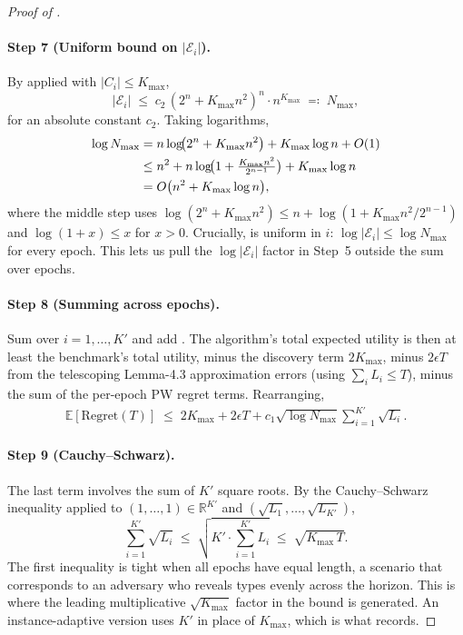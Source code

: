 \documentclass[letterpaper,9pt,twocolumn]{extarticle}
\newcommand{\cE}{\mathcal{E}}
\newcommand{\EE}{\mathbb{E}}
\newcommand{\RR}{\mathbb{R}}
\newcommand{\Kmax}{K_{\max}}
\newcommand{\Nmax}{N_{\max}}
\newcommand{\Regret}{\mathrm{Regret}}
\theoremstyle{plain}
\theoremstyle{definition}
\theoremstyle{remark}
\begin{document}
\begin{proof}[Proof of ]
\paragraph{Step 7 (Uniform bound on $|\cE_i|$).}
By  applied with $|C_i|\le\Kmax$,
\[
|\cE_i|\;\le\;c_2\,(2^n+\Kmax n^2)^n\cdot n^{\Kmax}\;\eqqcolon\;\Nmax,
\]
for an absolute constant $c_2$. Taking logarithms,
\begin{align}
\log\Nmax &= n\log\!\bigl(2^n+\Kmax n^2\bigr)+\Kmax\log n+O(1)\notag\\
&\le n^2+n\log\!\bigl(1+\tfrac{\Kmax n^2}{2^{n-1}}\bigr)+\Kmax\log n\notag\\
&= O\bigl(n^2+\Kmax\log n\bigr),
\label{eq:logN}
\end{align}
where the middle step uses $\log(2^n+\Kmax n^2)\le n+\log(1+\Kmax n^2/2^{n-1})$
and $\log(1+x)\le x$ for $x>0$. Crucially,  is uniform in
$i$: $\log|\cE_i|\le\log\Nmax$ for every epoch. This lets us pull the
$\log|\cE_i|$ factor in Step~5 outside the sum over epochs.

\paragraph{Step 8 (Summing across epochs).}
Sum  over $i=1,\dots,K'$ and add
. The algorithm's total expected utility is then at
least the benchmark's total utility, minus the discovery term $2\Kmax$,
minus $2\epsilon T$ from the telescoping Lemma-4.3 approximation errors
(using $\sum_i L_i\le T$), minus the sum of the per-epoch PW regret
terms. Rearranging,
\begin{align}
\EE[\Regret(T)]\;\le\;2\Kmax+2\epsilon T+c_1\sqrt{\log\Nmax}\!\sum_{i=1}^{K'}\!\sqrt{L_i}.
\label{eq:after-sum}
\end{align}

\paragraph{Step 9 (Cauchy--Schwarz).}
The last term involves the sum of $K'$ square roots. By the Cauchy--Schwarz
inequality applied to $(1,\dots,1)\in\RR^{K'}$ and
$(\sqrt{L_1},\dots,\sqrt{L_{K'}})$,
\begin{equation}
\sum_{i=1}^{K'}\!\sqrt{L_i}\;\le\;\sqrt{K'\cdot\!\sum_{i=1}^{K'}\!L_i}\;\le\;\sqrt{\Kmax\,T}.
\label{eq:CS}
\end{equation}
The first inequality is tight when all epochs have equal length, a
scenario that corresponds to an adversary who reveals types evenly across
the horizon. This is where the leading multiplicative $\sqrt{\Kmax}$
factor in the bound is generated. An instance-adaptive version uses $K'$
in place of $\Kmax$, which is what  records.


\end{proof}
\end{document}
